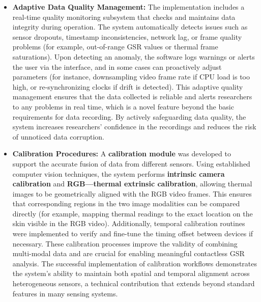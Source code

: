 \documentclass[11pt,a4paper]{report}
\begin{document}
\begin{itemize}
\item \textbf{Adaptive Data Quality Management:} The implementation includes a
  real-time quality monitoring subsystem that checks and maintains data
  integrity during operation. The system automatically detects issues
  such as sensor dropouts, timestamp inconsistencies, network lag, or
  frame quality problems (for example, out-of-range GSR values or
  thermal frame saturations). Upon detecting an anomaly, the software
  logs warnings or alerts the user via the interface, and in some cases
  can proactively adjust parameters (for instance, downsampling video
  frame rate if CPU load is too high, or re-synchronizing clocks if
  drift is detected). This adaptive quality management ensures that the
  data collected is reliable and alerts researchers to any problems in
  real time, which is a novel feature beyond the basic requirements for
  data recording. By actively safeguarding data quality, the system
  increases researchers' confidence in the recordings and reduces the
  risk of unnoticed data corruption.

\item \textbf{Calibration Procedures:} A \textbf{calibration
  module} was developed to support the accurate fusion of data from
  different sensors. Using established computer vision techniques, the
  system performs \textbf{intrinsic camera calibration} and \textbf{RGB---thermal
  extrinsic calibration}, allowing thermal images to be geometrically
  aligned with the RGB video frames. This ensures that corresponding
  regions in the two image modalities can be compared directly (for
  example, mapping thermal readings to the exact location on the skin
  visible in the RGB video). Additionally, temporal calibration routines
  were implemented to verify and fine-tune the timing offset between
  devices if necessary. These calibration processes improve the validity
  of combining multi-modal data and are crucial for enabling meaningful
  contactless GSR analysis. The successful implementation of calibration
  workflows demonstrates the system's ability to maintain both spatial
  and temporal alignment across heterogeneous sensors, a technical
  contribution that extends beyond standard features in many sensing
  systems.


\end{itemize}
\end{document}
